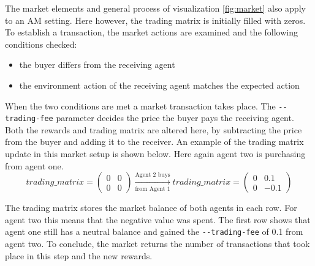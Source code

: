 The market elements and general process of visualization \ref{fig:market} also apply to an AM setting. Here however, the trading matrix is initially filled with zeros. 
To establish a transaction, the market actions are examined and the following conditions checked:
\begin{itemize}
    \item the buyer differs from the receiving agent
    \item the environment action of the receiving agent matches the expected action
\end{itemize}

When the two conditions are met a market transaction takes place. The \verb|--trading-fee| parameter decides the price the buyer pays the receiving agent. Both the rewards and trading matrix are altered here, by subtracting the price from the buyer and adding it to the receiver. An example of the trading matrix update in this market setup is shown below. Here again agent two is purchasing from agent one.
\begin{equation*}
trading\_matrix = 
\begin{pmatrix}
0 & 0 \\
0 & 0
\end{pmatrix} \xrightarrow[\text{from Agent 1}]{\text{Agent 2 buys}} 
trading\_matrix = 
\begin{pmatrix}
0 & 0.1 \\
0 & -0.1
\end{pmatrix} 
\end{equation*}

The trading matrix stores the market balance of both agents in each row. For agent two this means that the negative value was spent. The first row shows that agent one still has a neutral balance and gained the \verb|--trading-fee| of 0.1 from agent two. To conclude, the market returns the number of transactions that took place in this step and the new rewards.

